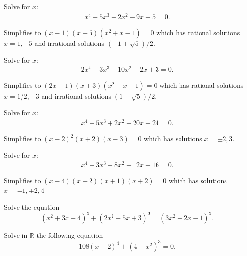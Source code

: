 \documentclass[12pt,a4paper]{memoir}
\theoremstyle{definition}
\begin{document}
\begin{question}
	Solve for $x$:
	\begin{align*}
		x^4+5x^3-2x^2-9x+5=0.
	\end{align*}
\end{question}

\begin{solution}
	Simplifies to $(x-1)(x+5)(x^2+x-1)=0$ which has rational solutions $x=1,-5$ and irrational solutions $(-1\pm\sqrt{5})/2$.
\end{solution}


\begin{question}
	Solve for $x$:
	\begin{align*}
		2x^4+3x^3-10x^2-2x+3=0.
	\end{align*}
\end{question}

\begin{solution}
	Simplifies to $(2x-1)(x+3)(x^2-x-1)=0$ which has rational solutions $x=1/2,-3$ and irrational solutions $(1\pm\sqrt{5})/2$.
\end{solution}


\begin{question}
	Solve for $x$:
	\begin{align*}
		x^4-5x^3+2x^2+20x-24=0.
	\end{align*}
\end{question}

\begin{solution}
	Simplifies to $(x-2)^2(x+2)(x-3)=0$ which has solutions $x=\pm 2, 3$.
\end{solution}


\begin{question}
	Solve for $x$:
	\begin{align*}
		x^4-3x^3-8x^2+12x+16=0.
	\end{align*}
\end{question}

\begin{solution}
	Simplifies to $(x - 4) (x - 2) (x + 1) (x + 2) =0$ which has solutions $x=-1,\pm 2, 4$.
\end{solution}


\begin{question}[name={2002 Croatia}]
	Solve the equation $$\left(x^2+3x-4\right)^3+\left(2x^2-5x+3\right)^3=\left(3x^2-2x-1\right)^3.$$
\end{question}

\begin{question}[name={2019 Greece}]
	Solve in $\mathbb{R}$ the following equation
	\[108 (x-2)^4 + (4- x^2)^3 = 0.\]
\end{question}
\end{document}
